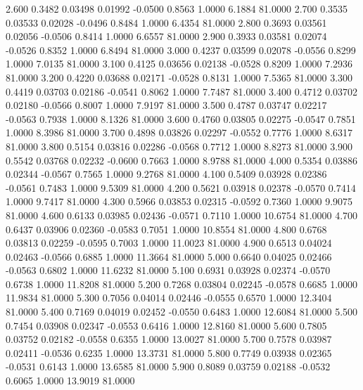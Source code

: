    2.600   0.3482   0.03498   0.01992  -0.0500   0.8563   1.0000   6.1884  81.0000
   2.700   0.3535   0.03533   0.02028  -0.0496   0.8484   1.0000   6.4354  81.0000
   2.800   0.3693   0.03561   0.02056  -0.0506   0.8414   1.0000   6.6557  81.0000
   2.900   0.3933   0.03581   0.02074  -0.0526   0.8352   1.0000   6.8494  81.0000
   3.000   0.4237   0.03599   0.02078  -0.0556   0.8299   1.0000   7.0135  81.0000
   3.100   0.4125   0.03656   0.02138  -0.0528   0.8209   1.0000   7.2936  81.0000
   3.200   0.4220   0.03688   0.02171  -0.0528   0.8131   1.0000   7.5365  81.0000
   3.300   0.4419   0.03703   0.02186  -0.0541   0.8062   1.0000   7.7487  81.0000
   3.400   0.4712   0.03702   0.02180  -0.0566   0.8007   1.0000   7.9197  81.0000
   3.500   0.4787   0.03747   0.02217  -0.0563   0.7938   1.0000   8.1326  81.0000
   3.600   0.4760   0.03805   0.02275  -0.0547   0.7851   1.0000   8.3986  81.0000
   3.700   0.4898   0.03826   0.02297  -0.0552   0.7776   1.0000   8.6317  81.0000
   3.800   0.5154   0.03816   0.02286  -0.0568   0.7712   1.0000   8.8273  81.0000
   3.900   0.5542   0.03768   0.02232  -0.0600   0.7663   1.0000   8.9788  81.0000
   4.000   0.5354   0.03886   0.02344  -0.0567   0.7565   1.0000   9.2768  81.0000
   4.100   0.5409   0.03928   0.02386  -0.0561   0.7483   1.0000   9.5309  81.0000
   4.200   0.5621   0.03918   0.02378  -0.0570   0.7414   1.0000   9.7417  81.0000
   4.300   0.5966   0.03853   0.02315  -0.0592   0.7360   1.0000   9.9075  81.0000
   4.600   0.6133   0.03985   0.02436  -0.0571   0.7110   1.0000  10.6754  81.0000
   4.700   0.6437   0.03906   0.02360  -0.0583   0.7051   1.0000  10.8554  81.0000
   4.800   0.6768   0.03813   0.02259  -0.0595   0.7003   1.0000  11.0023  81.0000
   4.900   0.6513   0.04024   0.02463  -0.0566   0.6885   1.0000  11.3664  81.0000
   5.000   0.6640   0.04025   0.02466  -0.0563   0.6802   1.0000  11.6232  81.0000
   5.100   0.6931   0.03928   0.02374  -0.0570   0.6738   1.0000  11.8208  81.0000
   5.200   0.7268   0.03804   0.02245  -0.0578   0.6685   1.0000  11.9834  81.0000
   5.300   0.7056   0.04014   0.02446  -0.0555   0.6570   1.0000  12.3404  81.0000
   5.400   0.7169   0.04019   0.02452  -0.0550   0.6483   1.0000  12.6084  81.0000
   5.500   0.7454   0.03908   0.02347  -0.0553   0.6416   1.0000  12.8160  81.0000
   5.600   0.7805   0.03752   0.02182  -0.0558   0.6355   1.0000  13.0027  81.0000
   5.700   0.7578   0.03987   0.02411  -0.0536   0.6235   1.0000  13.3731  81.0000
   5.800   0.7749   0.03938   0.02365  -0.0531   0.6143   1.0000  13.6585  81.0000
   5.900   0.8089   0.03759   0.02188  -0.0532   0.6065   1.0000  13.9019  81.0000
